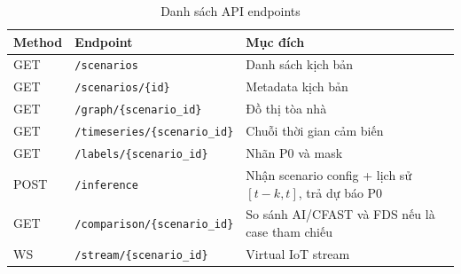 \begin{appendices}
\begin{table}[H]
\centering
\caption{Danh sách API endpoints}
\label{tab:api_detail}
\begin{tabularx}{\textwidth}{l l X}
\toprule
\textbf{Method} & \textbf{Endpoint} & \textbf{Mục đích} \\
\midrule
GET  & \texttt{/scenarios}                & Danh sách kịch bản \\
GET  & \texttt{/scenarios/\{id\}}         & Metadata kịch bản \\
GET  & \texttt{/graph/\{scenario\_id\}}   & Đồ thị tòa nhà \\
GET  & \texttt{/timeseries/\{scenario\_id\}} & Chuỗi thời gian cảm biến \\
GET  & \texttt{/labels/\{scenario\_id\}}  & Nhãn P0 và mask \\
POST & \texttt{/inference}                & Nhận scenario config + lịch sử $[t-k,t]$, trả dự báo P0 \\
GET  & \texttt{/comparison/\{scenario\_id\}} & So sánh AI/CFAST và FDS nếu là case tham chiếu \\
WS   & \texttt{/stream/\{scenario\_id\}}  & Virtual IoT stream \\
\bottomrule
\end{tabularx}
\end{table}

\end{appendices}
